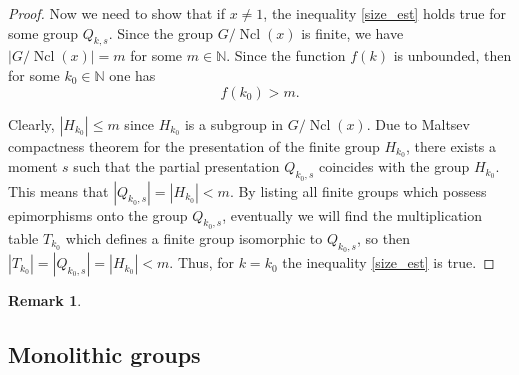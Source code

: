 \documentclass[12pt,a4paper]{amsart}
\newtheorem{remark}{Remark}
\DeclareMathOperator{\Ncl}{Ncl}
\begin{document}
\begin{proof}
\smallskip

Now we need to show that if $x\ne 1$, the inequality \eqref{size_est} holds true for some group $Q_{k,s}$. Since the group $G/\Ncl(x)$ is finite, we have $|G/\Ncl(x)|=m$ for some $m\in \mathbb N$. Since the function $f(k)$ is unbounded, then for some $k_0\in \mathbb N$ one has
\[
f(k_0)>m
.\]

Clearly, $|H_{k_0}|\leq m$ since $H_{k_0}$ is a subgroup in $G/\Ncl(x)$. Due to Maltsev compactness theorem for the presentation of the finite group $H_{k_0}$, there exists a moment $s$ such that the partial presentation $Q_{k_0,s}$ coincides with the group $H_{k_0}$. This means that $|Q_{k_0,s}|=|H_{k_0}|<m$. By listing all finite groups which possess epimorphisms onto the group $Q_{k_0,s}$, eventually we will find the multiplication table $T_{k_0}$ which defines a finite group isomorphic to $Q_{k_0,s}$, so then $|T_{k_0}|=|Q_{k_0,s}|=|H_{k_0}|<m$. Thus, for $k=k_0$ the inequality \eqref{size_est} is true.
\end{proof}

\begin{remark}
\label{alg_finite}
\end{remark}

\subsection{Monolithic groups}
\end{document}
